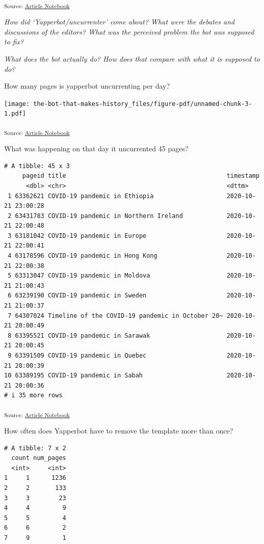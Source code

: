 \documentclass[
  Crown,
  times,
  sageh]{sagej}
\begin{document}
\textsubscript{Source:
\href{https://wikihistories.github.io/the-bot-that-makes-history/the-bot-that-makes-history-preview.html}{Article
Notebook}}

\emph{How did `Yapperbot/uncurrenter' come about? What were the debates
and discussions of the editors? What was the perceived problem the bot
was supposed to fix?}

\emph{What does the bot actually do? How does that compare with what it
is supposed to do?}

How many pages is yapperbot uncurrenting per day?

\texttt{[image: the-bot-that-makes-history\_files/figure-pdf/unnamed-chunk-3-1.pdf]}

\textsubscript{Source:
\href{https://wikihistories.github.io/the-bot-that-makes-history/the-bot-that-makes-history-preview.html}{Article
Notebook}}

What was happening on that day it uncurrented 45 pages?

\begin{verbatim}
# A tibble: 45 x 3
     pageid title                                            timestamp          
      <dbl> <chr>                                            <dttm>             
 1 63362621 COVID-19 pandemic in Ethiopia                    2020-10-21 23:00:28
 2 63431783 COVID-19 pandemic in Northern Ireland            2020-10-21 22:00:48
 3 63181042 COVID-19 pandemic in Europe                      2020-10-21 22:00:41
 4 63178596 COVID-19 pandemic in Hong Kong                   2020-10-21 22:00:38
 5 63313047 COVID-19 pandemic in Moldova                     2020-10-21 21:00:43
 6 63239190 COVID-19 pandemic in Sweden                      2020-10-21 21:00:37
 7 64307024 Timeline of the COVID-19 pandemic in October 20~ 2020-10-21 20:00:49
 8 63395521 COVID-19 pandemic in Sarawak                     2020-10-21 20:00:45
 9 63391509 COVID-19 pandemic in Quebec                      2020-10-21 20:00:39
10 63389195 COVID-19 pandemic in Sabah                       2020-10-21 20:00:36
# i 35 more rows
\end{verbatim}

\textsubscript{Source:
\href{https://wikihistories.github.io/the-bot-that-makes-history/the-bot-that-makes-history-preview.html}{Article
Notebook}}

How often does Yapperbot have to remove the template more than once?

\begin{verbatim}
# A tibble: 7 x 2
  count num_pages
  <int>     <int>
1     1      1236
2     2       133
3     3        23
4     4         9
5     5         4
6     6         2
7     9         1
\end{verbatim}
\end{document}
